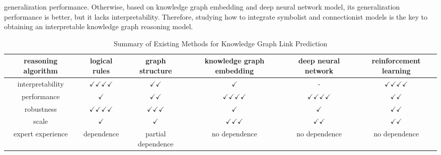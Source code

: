 \documentclass[10pt,journal,compsoc]{IEEEtran}
\begin{document}
generalization performance. Otherwise, based on knowledge graph embedding and deep neural network model, its generalization performance is better, but it lacks interpretability. Therefore, studying how to integrate symbolist and connectionist models is the key to obtaining an interpretable knowledge graph reasoning model.\par
\begin{table}[t]
\centering
\caption{Summary of Existing Methods for Knowledge Graph Link Prediction}
\label{tab:s}
\begin{tabular}{cccccc}
\hline
reasoning algorithm         & logical rules                   & graph structure                    & knowledge graph embedding                     & deep neural network                    & reinforcement learning       \\ \hline
interpretability           & $\checkmark \checkmark \checkmark \checkmark$ & $\checkmark \checkmark$            & $\checkmark$                                  & -                  &    $\checkmark \checkmark \checkmark \checkmark$             \\
performance & $\checkmark$                                  & $\checkmark \checkmark$            & $\checkmark \checkmark \checkmark \checkmark$ & $\checkmark \checkmark \checkmark \checkmark$ & $\checkmark \checkmark$\\
robustness                 & $\checkmark \checkmark \checkmark \checkmark$ & $\checkmark \checkmark \checkmark$ & $\checkmark$                                  & $\checkmark$                                 &  $\checkmark\checkmark$ \\
scale                      & $\checkmark$                                  & $\checkmark$                       & $\checkmark \checkmark \checkmark$            & $\checkmark \checkmark$      &      $\checkmark \checkmark$            \\
expert experience          & dependence                                    & partial dependence                 & no dependence                                 & no dependence           & no dependence                      \\ \hline
\end{tabular}
\end{table}
\end{document}
